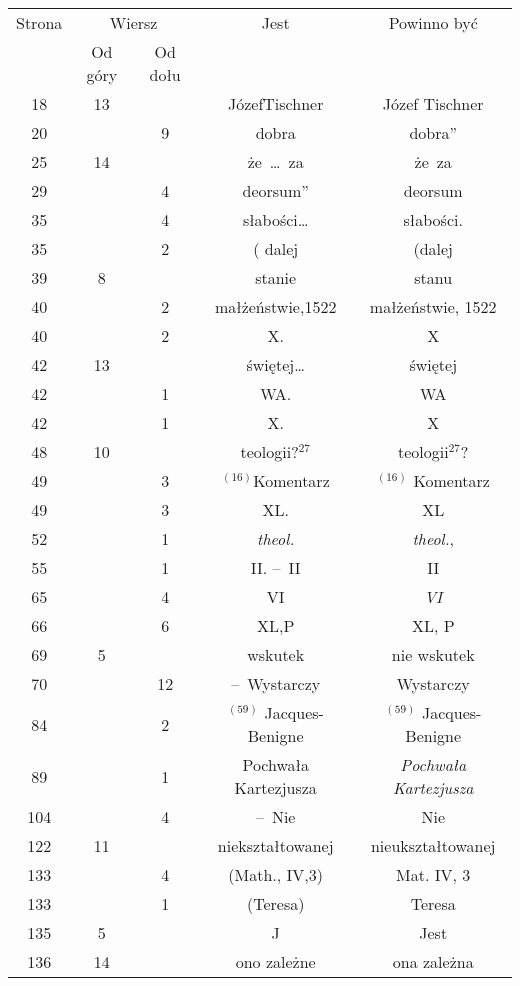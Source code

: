 \documentclass[a4paper,11pt]{article}
\numberwithin{equation}{section}
\begin{document}
\begin{center}

  \begin{tabular}{|c|c|c|c|c|}
    \hline
    Strona & \multicolumn{2}{c|}{Wiersz} & Jest
                              & Powinno być \\ \cline{2-3}
    & Od góry & Od dołu & & \\
    \hline
    18  & 13 & & JózefTischner & Józef Tischner \\
    20  & &  9 & dobra & dobra” \\
        25  & 14 & & że~\ldots~za & że~za \\
    29  & &  4 & deorsum” & deorsum \\
    35  & &  4 & słabości\ldots & słabości. \\
    35  & &  2 & ( dalej & (dalej \\
    39  &  8 & & stanie & stanu \\
    40  & &  2 & małżeństwie,1522 & małżeństwie, 1522 \\
    40  & &  2 & X. & X \\
    42  & 13 & & świętej\ldots & świętej \\
    42  & &  1 & WA. & WA \\
    42  & &  1 & X. & X \\
    48  & 10 & & teologii?$^{ 27 }$ & teologii$^{ 27 }$? \\
    49  & &  3 & $^{ ( 16 ) }$Komentarz & $^{ ( 16 ) }$ Komentarz \\
    49  & &  3 & XL. & XL \\
    52  & &  1 & \textit{theol.} & \textit{theol.}, \\
    55  & &  1 & II. --~II & II \\
    65  & &  4 & VI & \textit{VI} \\
    66  & &  6 & XL,P & XL, P \\
    69  &  5 & & wskutek & nie wskutek \\
    70  & & 12 & --~Wystarczy & Wystarczy \\
    84  & &  2 & $^{ ( 59 ) }$\hspace{0.3em} Jacques-Benigne
           & $^{ ( 59 ) }$ Jacques-Benigne \\
    89  & &  1 & Pochwała Kartezjusza & \textit{Pochwała Kartezjusza} \\
    104 & &  4 & --~Nie & Nie \\
    122 & 11 & & niekształtowanej & nieukształtowanej \\
    133 & &  4 & (Math., IV,3) & Mat. IV, 3 \\
    133 & &  1 & (Teresa) & Teresa \\
    135 &  5 & & J & Jest \\
    136 & 14 & & ono zależne & ona zależna \\
    \hline
  \end{tabular}






\end{center}
\end{document}
